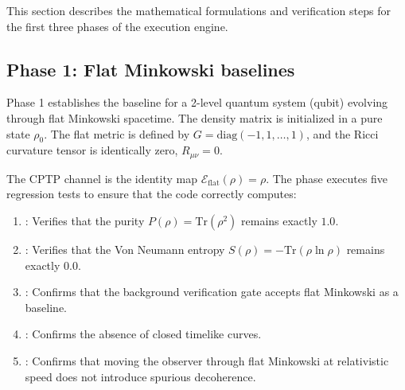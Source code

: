 
This section describes the mathematical formulations and verification steps for the first three phases of the execution engine.

\subsection{Phase 1: Flat Minkowski baselines}
Phase 1 establishes the baseline for a 2-level quantum system (qubit) evolving through flat Minkowski spacetime. The density matrix is initialized in a pure state $\rho_0$. The flat metric is defined by $G = \text{diag}(-1, 1, \dots, 1)$, and the Ricci curvature tensor is identically zero, $R_{\mu\nu} = 0$. 

The CPTP channel is the identity map $\mathcal{E}_{\text{flat}}(\rho) = \rho$. The phase executes five regression tests to ensure that the code correctly computes:
\begin{enumerate}
  \item {}: Verifies that the purity $P(\rho) = \text{Tr}(\rho^2)$ remains exactly $1.0$.
  \item {}: Verifies that the Von Neumann entropy $S(\rho) = -\text{Tr}(\rho \ln \rho)$ remains exactly $0.0$.
  \item {}: Confirms that the background verification gate accepts flat Minkowski as a baseline.
  \item {}: Confirms the absence of closed timelike curves.
  \item {}: Confirms that moving the observer through flat Minkowski at relativistic speed does not introduce spurious decoherence.
\end{enumerate}

